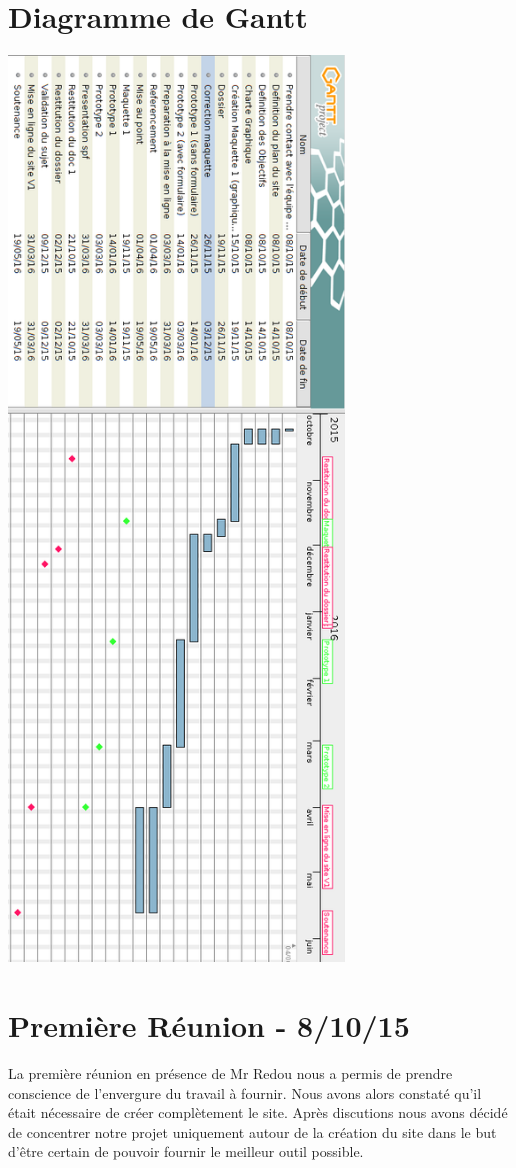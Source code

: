 \documentclass[a4paper, 12pt]{report}
\begin{document}
\section{Diagramme de Gantt}
\begin{center}
\includegraphics[height=24cm]{gantt.png}
\end{center}
\newpage
\section{Première Réunion - 8/10/15}
La première réunion en présence de Mr Redou nous a permis de prendre conscience de l'envergure du travail à fournir. Nous avons alors constaté qu'il était nécessaire de créer complètement le site. Après discutions nous avons décidé de concentrer notre projet uniquement autour de la création du site dans le but d’être certain de pouvoir fournir le meilleur outil possible.
\end{document}
